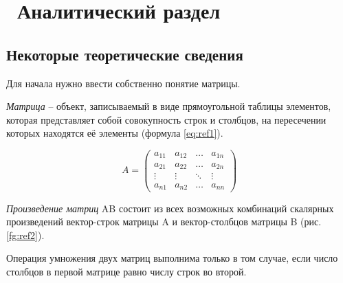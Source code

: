 \chapter{ Аналитический раздел}
\label{cha:analysis}

\section{Некоторые теоретические сведения}

Для начала нужно ввести собственно понятие матрицы.

\textit{Матрица} -- объект, записываемый в виде прямоугольной таблицы элементов,
которая представляет собой совокупность строк и столбцов, на пересечении которых находятся её элементы (формула \ref{eq:ref1}).

\begin{equation}
	A = \left(
	\begin{array}{cccc}
			a_{11} & a_{12} & \ldots & a_{1n} \\
			a_{21} & a_{22} & \ldots & a_{2n} \\
			\vdots & \vdots & \ddots & \vdots \\
			a_{n1} & a_{n2} & \ldots & a_{nn}
		\end{array}
	\right)
	\label{eq:ref1}
\end{equation}

\textit{Произведение матриц} AB состоит из всех возможных комбинаций скалярных произведений 
вектор-строк матрицы A и вектор-столбцов матрицы B (рис. \ref{fg:ref2}).

\begin{figure}[ht!]
\end{figure}

Операция умножения двух матриц выполнима только в том случае, если число столбцов в первой матрице равно числу строк во второй.

